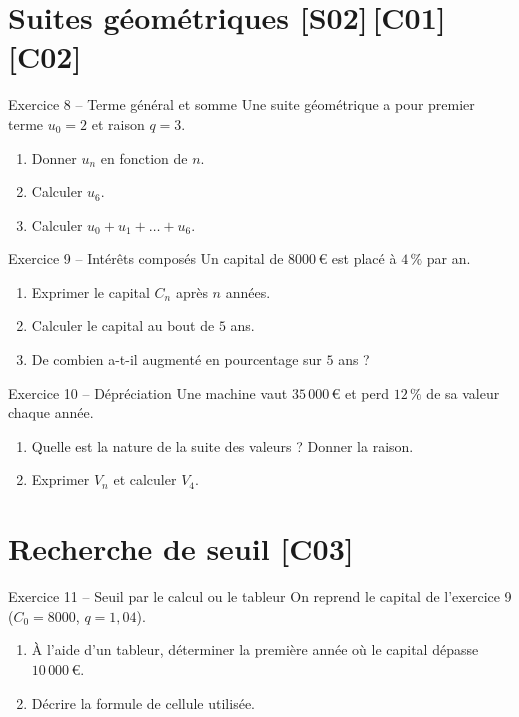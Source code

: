 \documentclass[a4paper,11pt]{article}
\begin{document}
\section{Suites géométriques \hfill {\normalsize\color{uimmred}[S02]\,[C01]\,[C02]}}

\begin{exo}{Exercice 8 -- Terme général et somme}
Une suite géométrique a pour premier terme $u_0 = 2$ et raison $q = 3$.
\begin{enumerate}[label=\alph*)]
  \item Donner $u_n$ en fonction de $n$.
  \item Calculer $u_6$.
  \item Calculer $u_0 + u_1 + \dots + u_6$.
\end{enumerate}
\end{exo}

\begin{exo}{Exercice 9 -- Intérêts composés}
Un capital de $8000\,$€ est placé à $4\,\%$ par an.
\begin{enumerate}[label=\alph*)]
  \item Exprimer le capital $C_n$ après $n$ années.
  \item Calculer le capital au bout de $5$ ans.
  \item De combien a-t-il augmenté en pourcentage sur $5$ ans ?
\end{enumerate}
\end{exo}

\begin{exo}{Exercice 10 -- Dépréciation}
Une machine vaut $35\,000\,$€ et perd $12\,\%$ de sa valeur chaque année.
\begin{enumerate}[label=\alph*)]
  \item Quelle est la nature de la suite des valeurs ? Donner la raison.
  \item Exprimer $V_n$ et calculer $V_4$.
\end{enumerate}
\end{exo}

\section{Recherche de seuil \hfill {\normalsize\color{uimmred}[C03]}}

\begin{exo}{Exercice 11 -- Seuil par le calcul ou le tableur}
On reprend le capital de l'exercice 9 ($C_0 = 8000$, $q = 1{,}04$).
\begin{enumerate}[label=\alph*)]
  \item À l'aide d'un tableur, déterminer la première année où le capital dépasse $10\,000\,$€.
  \item Décrire la formule de cellule utilisée.
\end{enumerate}
\end{exo}
\end{document}

